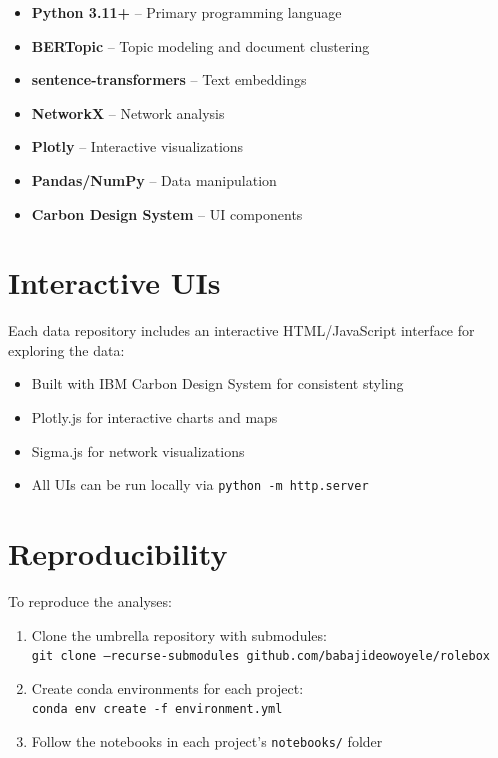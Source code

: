 \documentclass[../main.tex]{subfiles}
\begin{document}
\begin{itemize}
\item \textbf{Python 3.11+} -- Primary programming language
\item \textbf{BERTopic} -- Topic modeling and document clustering
\item \textbf{sentence-transformers} -- Text embeddings
\item \textbf{NetworkX} -- Network analysis
\item \textbf{Plotly} -- Interactive visualizations
\item \textbf{Pandas/NumPy} -- Data manipulation
\item \textbf{Carbon Design System} -- UI components
\end{itemize}

\section{Interactive UIs}

Each data repository includes an interactive HTML/JavaScript interface for exploring the data:

\begin{itemize}
\item Built with IBM Carbon Design System for consistent styling
\item Plotly.js for interactive charts and maps
\item Sigma.js for network visualizations
\item All UIs can be run locally via \texttt{python -m http.server}
\end{itemize}

\section{Reproducibility}

To reproduce the analyses:

\begin{enumerate}
\item Clone the umbrella repository with submodules:\\
\texttt{git clone --recurse-submodules github.com/babajideowoyele/rolebox}

\item Create conda environments for each project:\\
\texttt{conda env create -f environment.yml}

\item Follow the notebooks in each project's \texttt{notebooks/} folder
\end{enumerate}
\end{document}
